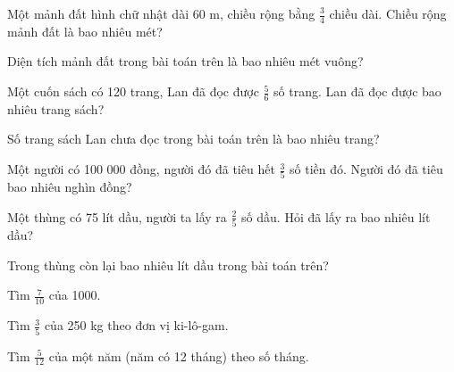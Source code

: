\begin{ex}
Một mảnh đất hình chữ nhật dài 60 m, chiều rộng bằng $\frac{3}{4}$ chiều dài. Chiều rộng mảnh đất là bao nhiêu mét?
\end{ex}

\begin{ex}
Diện tích mảnh đất trong bài toán trên là bao nhiêu mét vuông?
\end{ex}

\begin{ex}
Một cuốn sách có 120 trang, Lan đã đọc được $\frac{5}{6}$ số trang. Lan đã đọc được bao nhiêu trang sách?
\end{ex}

\begin{ex}
Số trang sách Lan chưa đọc trong bài toán trên là bao nhiêu trang?
\end{ex}

\begin{ex}
Một người có 100 000 đồng, người đó đã tiêu hết $\frac{3}{5}$ số tiền đó. Người đó đã tiêu bao nhiêu nghìn đồng?
\end{ex}

\begin{ex}
Một thùng có 75 lít dầu, người ta lấy ra $\frac{2}{5}$ số dầu. Hỏi đã lấy ra bao nhiêu lít dầu?
\end{ex}

\begin{ex}
Trong thùng còn lại bao nhiêu lít dầu trong bài toán trên?
\end{ex}

\begin{ex}
Tìm $\frac{7}{10}$ của 1000.
\end{ex}

\begin{ex}
Tìm $\frac{3}{5}$ của 250 kg theo đơn vị ki-lô-gam.
\end{ex}

\begin{ex}
Tìm $\frac{5}{12}$ của một năm (năm có 12 tháng) theo số tháng.
\end{ex}

